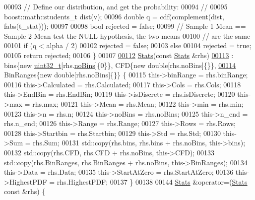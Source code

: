 \begin{DoxyCode}
00093     \textcolor{comment}{// Define our distribution, and get the probability:}
00094     \textcolor{comment}{//}
00095     boost::math::students\_t dist(v);
00096     \textcolor{keywordtype}{double} q = cdf(complement(dist, fabs(t\_stat)));
00097 
00098     \textcolor{keywordtype}{bool} rejected = \textcolor{keyword}{false};
00099     \textcolor{comment}{// Sample 1 Mean == Sample 2 Mean test the NULL hypothesis, the two means}
00100     \textcolor{comment}{// are the same}
00101     \textcolor{keywordflow}{if} (q < alpha / 2)
00102       rejected = \textcolor{keyword}{false};
00103     \textcolor{keywordflow}{else}
00104       rejected = \textcolor{keyword}{true};
00105     \textcolor{keywordflow}{return} rejected;
00106   \}
00107 
\hypertarget{_stats_8h_source_l00112}{}\hyperlink{class_soil_math_1_1_stats_aa9727b7ea39b46f8a010a7b710b26d83}{00112}   \hyperlink{class_soil_math_1_1_stats_aa9727b7ea39b46f8a010a7b710b26d83}{Stats}(\textcolor{keyword}{const} \hyperlink{class_soil_math_1_1_stats}{Stats} &rhs)
\hypertarget{_stats_8h_source_l00113}{}\hyperlink{class_soil_math_1_1_stats_a4c462b7b476263abc57d3f1faba1b2da}{00113}       : bins\{\textcolor{keyword}{new} \hyperlink{_soil_math_types_8h_a435d1572bf3f880d55459d9805097f62}{uint32\_t}[rhs.\hyperlink{class_soil_math_1_1_stats_a4202c9085eacaff2e04eda84fc90e92b}{noBins}]\{0\}\}, CFD\{\textcolor{keyword}{new} \textcolor{keywordtype}{double}[rhs.noBins]\{\}\},
\hypertarget{_stats_8h_source_l00114}{}\hyperlink{class_soil_math_1_1_stats_a926290338b0325a457f65d562a328e07}{00114}         BinRanges\{\textcolor{keyword}{new} \textcolor{keywordtype}{double}[rhs.noBins]\{\}\} \{
00115     this->binRange = rhs.binRange;
00116     this->Calculated = rhs.Calculated;
00117     this->Cols = rhs.Cols;
00118     this->EndBin = rhs.EndBin;
00119     this->isDiscrete = rhs.isDiscrete;
00120     this->max = rhs.max;
00121     this->Mean = rhs.Mean;
00122     this->min = rhs.min;
00123     this->n = rhs.n;
00124     this->noBins = rhs.noBins;
00125     this->n\_end = rhs.n\_end;
00126     this->Range = rhs.Range;
00127     this->Rows = rhs.Rows;
00128     this->Startbin = rhs.Startbin;
00129     this->Std = rhs.Std;
00130     this->Sum = rhs.Sum;
00131     std::copy(rhs.bins, rhs.bins + rhs.noBins, this->bins);
00132     std::copy(rhs.CFD, rhs.CFD + rhs.noBins, this->CFD);
00133     std::copy(rhs.BinRanges, rhs.BinRanges + rhs.noBins, this->BinRanges);
00134     this->Data = rhs.Data;
00135     this->StartAtZero = rhs.StartAtZero;
00136     this->HighestPDF = rhs.HighestPDF;
00137   \}
00138 
00144   \hyperlink{class_soil_math_1_1_stats_aa9727b7ea39b46f8a010a7b710b26d83}{Stats} &operator=(\hyperlink{class_soil_math_1_1_stats_aa9727b7ea39b46f8a010a7b710b26d83}{Stats} \textcolor{keyword}{const} &rhs) \{

\end{DoxyCode}

